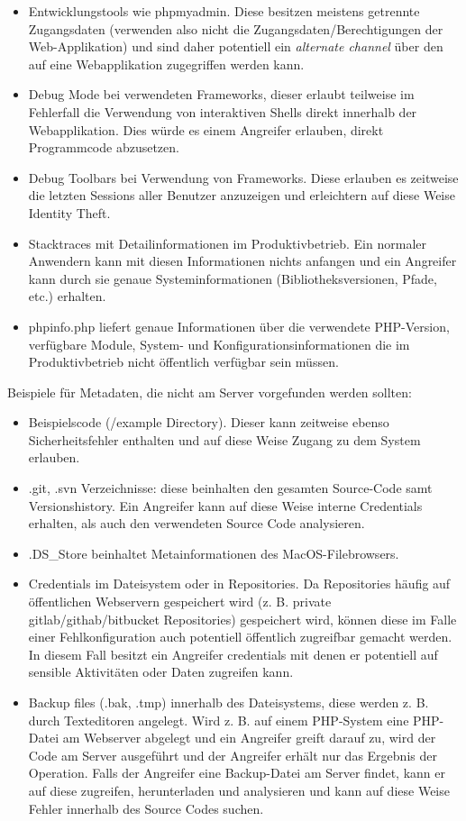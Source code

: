 \begin{itemize}
	\item Entwicklungstools wie phpmyadmin. Diese besitzen meistens getrennte Zugangsdaten (verwenden also nicht die Zugangsdaten/Berechtigungen der Web-Applikation) und sind daher potentiell ein \textit{alternate channel} über den auf eine Webapplikation zugegriffen werden kann.
	\item Debug Mode bei verwendeten Frameworks, dieser erlaubt teilweise im Fehlerfall die Verwendung von interaktiven Shells direkt innerhalb der Webapplikation. Dies würde es einem Angreifer erlauben, direkt Programmcode abzusetzen.
	\item Debug Toolbars bei Verwendung von Frameworks. Diese erlauben es zeitweise die letzten Sessions aller Benutzer anzuzeigen und erleichtern auf diese Weise Identity Theft.
	\item Stacktraces mit Detailinformationen im Produktivbetrieb. Ein normaler Anwendern kann mit diesen Informationen nichts anfangen und ein Angreifer kann durch sie genaue Systeminformationen (Bibliotheksversionen, Pfade, etc.) erhalten.
	\item phpinfo.php liefert genaue Informationen über die verwendete PHP-Version, verfügbare Module, System- und Konfigurationsinformationen die im Produktivbetrieb nicht öffentlich verfügbar sein müssen.
\end{itemize}

Beispiele für Metadaten, die nicht am Server vorgefunden werden sollten:

\begin{itemize}
	\item Beispielscode (/example Directory). Dieser kann zeitweise ebenso Sicherheitsfehler enthalten und auf diese Weise Zugang zu dem System erlauben.
	\item .git, .svn Verzeichnisse: diese beinhalten den gesamten Source-Code samt Versionshistory. Ein Angreifer kann auf diese Weise interne Credentials erhalten, als auch den verwendeten Source Code analysieren.
	\item .DS\_Store beinhaltet Metainformationen des MacOS-Filebrowsers.
	\item Credentials im Dateisystem oder in Repositories. Da Repositories häufig auf öffentlichen Webservern gespeichert wird (z. B. private gitlab/githab/bitbucket Repositories) gespeichert wird, können diese im Falle einer Fehlkonfiguration auch potentiell öffentlich zugreifbar gemacht werden. In diesem Fall besitzt ein Angreifer credentials mit denen er potentiell auf sensible Aktivitäten oder Daten zugreifen kann.
	\item Backup files (.bak, .tmp) innerhalb des Dateisystems, diese werden z. B. durch Texteditoren angelegt. Wird z. B. auf einem PHP-System eine PHP-Datei am Webserver abgelegt und ein Angreifer greift darauf zu, wird der Code am Server ausgeführt und der Angreifer erhält nur das Ergebnis der Operation. Falls der Angreifer eine Backup-Datei am Server findet, kann er auf diese zugreifen, herunterladen und analysieren und kann auf diese Weise Fehler innerhalb des Source Codes suchen.
\end{itemize}

